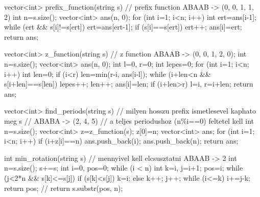 vector<int> prefix_function(string s) {
    // prefix function ABAAB -> (0, 0, 1, 1, 2)
    int n=s.size();
    vector<int> ans(n, 0);
    for (int i=1; i<n; i++) {
        int ert=ans[i-1];
        while (ert && s[i]!=s[ert]) {
            ert=ans[ert-1];
        }
        if (s[i]==s[ert]) {
            ert++;
        }
        ans[i]=ert;
    }
    return ans;
}

vector<int> z_function(string s) {
    // z function ABAAB -> (0, 0, 1, 2, 0);
    int n=s.size();
    vector<int> ans(n, 0);
    int l=0, r=0;
    int lepes=0;
    for (int i=1; i<n; i++) {
        int len=0;
        if (i<r) {
            len=min(r-i, ans[i-l]);
        }
        while (i+len<n && s[i+len]==s[len]) {
            lepes++;
            len++;
        }
        ans[i]=len;
        if (i+len>r) {
            l=i, r=i+len;
        }
    }
    return ans;
}


vector<int> find_periods(string s) {
    // milyen hosszu prefix ismetlesevel kaphato meg s
    // ABABA -> (2, 4, 5)
    // a teljes periodushoz (n\%i==0) feltetel kell
    int n=s.size();
    vector<int> z=z_function(s);
    z[0]=n;
    vector<int> ans;
    for (int i=1; i<n; i++) {
        if (i+z[i]==n) {
            ans.push_back(i);
        }
    }
    ans.push_back(n);
    return ans;
}

int min_rotation(string s) {
    // mennyivel kell elcsusztatni ABAAB -> 2
    int n=s.size();
    s+=s;
    int i=0, pos=0;
    while (i < n) {
        int k=i, j=i+1;
        pos=i;
        while (j<2*n && s[k]<=s[j]) {
            if (s[k]<s[j]) k=i;
            else k++;
            j++;
        }
        while (i<=k) {
            i+=j-k;
        }
    }
    return pos;
    // return s.substr(pos, n);
}